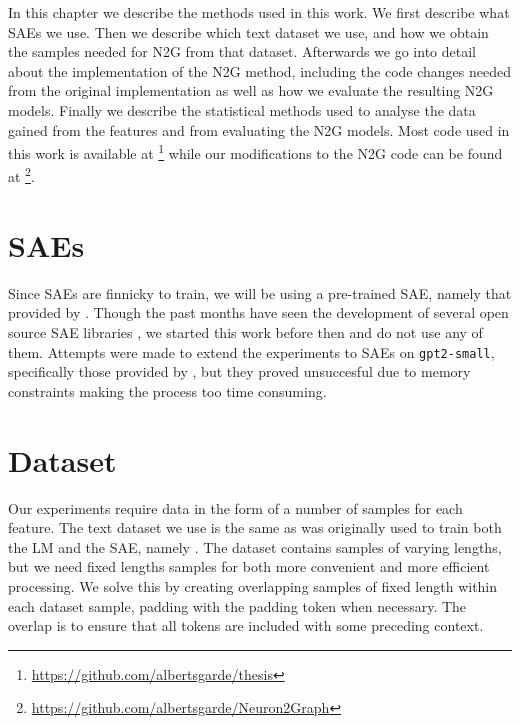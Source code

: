In this chapter we describe the methods used in this work.
We first describe what SAEs we use.
Then we describe which text dataset we use, and how we obtain the samples needed for N2G from that dataset.
Afterwards we go into detail about the implementation of the N2G method, including the code changes needed from the original implementation as well as how we evaluate the resulting N2G models.
Finally we describe the statistical methods used to analyse the data gained from the features and from evaluating the N2G models.
Most code used in this work is available at \footnote{\url{https://github.com/albertsgarde/thesis}} while our modifications to the N2G code can be found at \footnote{\url{https://github.com/albertsgarde/Neuron2Graph}}.

\section{SAEs}
Since SAEs are finnicky to train, we will be using a pre-trained SAE, namely that provided by \textcite{nanda_neelnandasparse_autoencoder_nodate}.
Though the past months have seen the development of several open source SAE libraries \parencite{bloom_jbloomaussaelens_2024}\parencite{cooney_ai-safety-foundationsparse_autoencoder_2024}, we started this work before then and do not use any of them.
Attempts were made to extend the experiments to SAEs on \texttt{gpt2-small}, specifically those provided by \textcite{wu_openaisparse_autoencoder_2024}, but they proved unsuccesful due to memory constraints making the process too time consuming.

\section{Dataset}
\label{sec:dataset}
Our experiments require data in the form of a number of samples for each feature.
The text dataset we use is the same as was originally used to train both the LM and the SAE, namely \textcite{nanda_neelnandac4-code-20k_nodate}.
The dataset contains samples of varying lengths, but we need fixed lengths samples for both more convenient and more efficient processing.
We solve this by creating overlapping samples of fixed length within each dataset sample, padding with the padding token when necessary.
The overlap is to ensure that all tokens are included with some preceding context.

